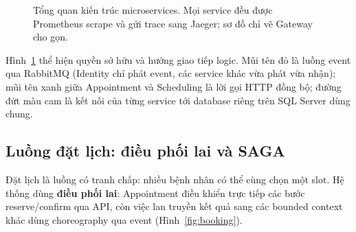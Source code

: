 \begin{figure}[t]
{%
}
\caption{Tổng quan kiến trúc microservices. Mọi service đều được Prometheus scrape và gửi trace sang Jaeger; sơ đồ chỉ vẽ Gateway cho gọn.}
\label{fig:overview}
\end{figure}

Hình~\ref{fig:overview} thể hiện quyền sở hữu và hướng giao tiếp logic. Mũi tên đỏ là luồng event qua RabbitMQ (Identity chỉ phát event, các service khác vừa phát vừa nhận); mũi tên xanh giữa Appointment và Scheduling là lời gọi HTTP đồng bộ; đường đứt màu cam là kết nối của từng service tới database riêng trên SQL Server dùng chung.

\subsection{Luồng đặt lịch: điều phối lai và SAGA}

Đặt lịch là luồng có tranh chấp: nhiều bệnh nhân có thể cùng chọn một slot. Hệ thống dùng \textbf{điều phối lai}: Appointment điều khiển trực tiếp các bước reserve/confirm qua API, còn việc lan truyền kết quả sang các bounded context khác dùng choreography qua event (Hình~\ref{fig:booking}).

